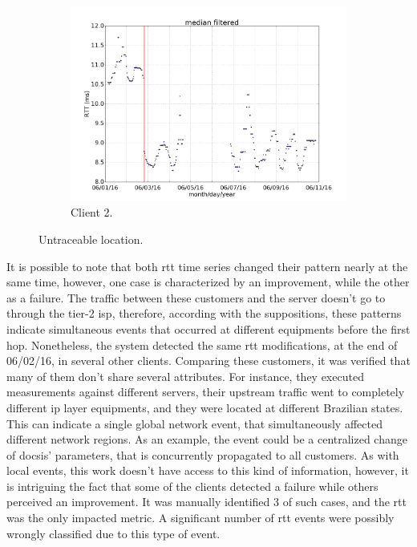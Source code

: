 \begin{figure}[H]
{\begin{subfigure}[b]{0.55\textwidth}
            \includegraphics[width=\textwidth]{./figures/results/wrong_examples/untraceable_example/serverBHZDTCLDM062_mac64:66:B3:50:00:B6_dtstart2016-06-01_dtend2016-06-11.png}
            \caption{Client 2.}\label{fig:untraceable_location_client_2}
        \end{subfigure}%
    }
    \caption{Untraceable location.}
\label{fig:untraceable_location}
\end{figure}%

It is possible to note that both \gls*{rtt} time series changed their pattern
nearly at the same time, however, one case is characterized by an improvement,
while the other as a failure.
The traffic between these customers and the server
doesn't go to through the tier-2 \gls*{isp}, therefore, according with the
suppositions, these patterns indicate simultaneous events that occurred at
different equipments before the first hop.
Nonetheless, the system detected the same \gls*{rtt} modifications, at the end of
06/02/16, in several other clients.
Comparing these customers, it was verified that many of them don't share
several attributes.
For instance, they executed measurements against different servers, their
upstream traffic went to completely different \gls*{ip} layer equipments, and they
were located at different Brazilian states.
This can indicate a single global network event, that simultaneously affected
different network regions. As an example, the event could be a centralized
change of \gls*{docsis}' parameters, that is concurrently propagated to all customers.
As with local events, this work doesn't have access to this kind of
information, however, it is intriguing the fact that some of the clients
detected a failure while others perceived an improvement.
It was manually identified 3 of such cases,
and the \gls*{rtt} was the only impacted metric.
A significant number of \gls*{rtt} events were possibly wrongly classified due to this
type of event.

